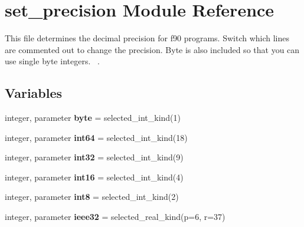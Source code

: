 \hypertarget{namespaceset__precision}{}\section{set\+\_\+precision Module Reference}
\label{namespaceset__precision}


This file determines the decimal precision for f90 programs. Switch which lines are commented out to change the precision. Byte is also included so that you can use single byte integers.~\newline
.  


\subsection*{Variables}
\begin{DoxyCompactItemize}
\item 
\hypertarget{namespaceset__precision_a8fd1e6ca7816e7db801cd467b1dee8b4}{}\label{namespaceset__precision_a8fd1e6ca7816e7db801cd467b1dee8b4} 
integer, parameter {\bfseries byte} = selected\+\_\+int\+\_\+kind(1)
\item 
\hypertarget{namespaceset__precision_a1a419a5b32b59def253716b18c4943d6}{}\label{namespaceset__precision_a1a419a5b32b59def253716b18c4943d6} 
integer, parameter {\bfseries int64} = selected\+\_\+int\+\_\+kind(18)
\item 
\hypertarget{namespaceset__precision_a27cc43adc78b1fe580d0d376bb5f8c6c}{}\label{namespaceset__precision_a27cc43adc78b1fe580d0d376bb5f8c6c} 
integer, parameter {\bfseries int32} = selected\+\_\+int\+\_\+kind(9)
\item 
\hypertarget{namespaceset__precision_ad34de41786b019a0fd8e6d48548992cb}{}\label{namespaceset__precision_ad34de41786b019a0fd8e6d48548992cb} 
integer, parameter {\bfseries int16} = selected\+\_\+int\+\_\+kind(4)
\item 
\hypertarget{namespaceset__precision_acb9c04da28e9f11e48fce2ca4f8c0bb0}{}\label{namespaceset__precision_acb9c04da28e9f11e48fce2ca4f8c0bb0} 
integer, parameter {\bfseries int8} = selected\+\_\+int\+\_\+kind(2)
\item 
\hypertarget{namespaceset__precision_a37da73d727730fbd7cab8d7e2a65a067}{}\label{namespaceset__precision_a37da73d727730fbd7cab8d7e2a65a067} 
integer, parameter {\bfseries ieee32} = selected\+\_\+real\+\_\+kind(p=6, r=37)
\item 
\hypertarget{namespaceset__precision_a3e2b8f3129c24855d9bb080d6a22fa69}{}\label{namespaceset__precision_a3e2b8f3129c24855d9bb080d6a22fa69} 

\end{DoxyCompactItemize}
